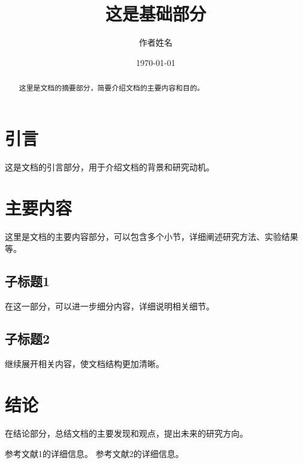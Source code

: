 \documentclass{article} %
\begin{document}
\title{这是基础部分}
\author{作者姓名}
\date{\today}
\maketitle

\begin{abstract}
这里是文档的摘要部分，简要介绍文档的主要内容和目的。
\end{abstract}

\section{引言}
这是文档的引言部分，用于介绍文档的背景和研究动机。

\section{主要内容}
这里是文档的主要内容部分，可以包含多个小节，详细阐述研究方法、实验结果等。

\subsection{子标题1}
在这一部分，可以进一步细分内容，详细说明相关细节。

\subsection{子标题2}
继续展开相关内容，使文档结构更加清晰。

\section{结论}
在结论部分，总结文档的主要发现和观点，提出未来的研究方向。

\begin{thebibliography}{99}
 参考文献1的详细信息。
 参考文献2的详细信息。
\end{thebibliography}
\end{document}
